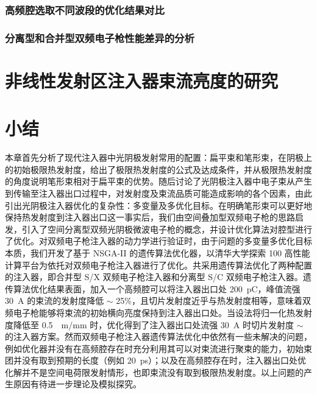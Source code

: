 \subsubsection{高频腔选取不同波段的优化结果对比}

\subsubsection{分离型和合并型双频电子枪性能差异的分析}

\section{非线性发射区注入器束流亮度的研究}

\section{小结}
本章首先分析了现代注入器中光阴极发射常用的配置：扁平束和笔形束，在阴极上的初始极限热发射度，给出了极限热发射度的公式及达成条件，并从极限热发射度的角度说明笔形束相对于扁平束的优势。随后讨论了光阴极注入器中电子束从产生到传输至注入器出口过程中，对发射度及束流品质可能造成影响的各个因素，由此引出光阴极注入器优化的复杂性：多变量及多优化目标。在明确笔形束可以更好地保持热发射度到注入器出口这一事实后，我们由空间叠加型双频电子枪的思路启发，引入了空间分离型双频光阴极微波电子枪的概念，并设计优化算法对腔型进行了优化。对双频电子枪注入器的动力学进行验证时，由于问题的多变量多优化目标本质，我们开发了基于 NSGA-II 的遗传算法优化器，以清华大学探索 100 高性能计算平台为依托对双频电子枪注入器进行了优化。共采用遗传算法优化了两种配置的注入器，即合并型 S/X 双频电子枪注入器和分离型 S/C 双频电子枪注入器。遗传算法优化结果表面，加入一个高频腔可以将注入器出口处 \SI{200}{pC}，峰值流强 \SI{30}{A} 的束流的发射度降低 $\sim$ 25\%，且切片发射度近乎与热发射度相等，意味着双频电子枪能够将束流的初始横向亮度保持到注入器出口处。当设法将归一化热发射度降低至 \SI{0.5}{\mu m/mm} 时，优化得到了注入器出口处流强 \SI{30}{A} 时切片发射度 $\sim$  的注入器方案。然而双频电子枪注入器遗传算法优化中依然有一些未解决的问题，例如优化器并没有在高频腔存在时充分利用其可以对束流进行聚束的能力，初始束团并没有取到预期的长度（例如 \SI{20}{ps}）；以及在高频腔存在时，注入器出口处优化解并不是空间电荷限发射情形，也即束流没有取到极限热发射度。以上问题的产生原因有待进一步理论及模拟探究。
